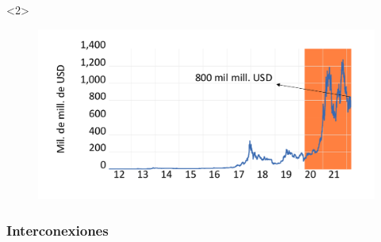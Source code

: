 \begin{frame}
        \begin{onlyenv}<2>
        \begin{figure}[H]
        \begin{center}
         \includegraphics[width=1\textwidth]{images/C1/cap_shade_text.pdf}
         \end{center}
        \end{figure}
        \end{onlyenv}

\note{
\begin{itemize}
    \item 
\end{itemize}
}
    
\end{frame}

\subsubsection{Interconexiones}

